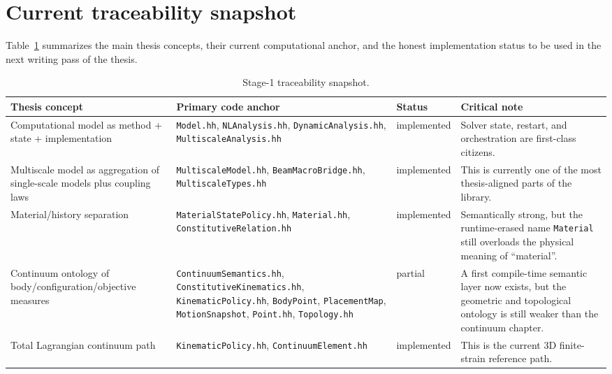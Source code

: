 \section{Current traceability snapshot}

Table~\ref{tab:stage1-traceability} summarizes the main thesis concepts, their
current computational anchor, and the honest implementation status to be used
in the next writing pass of the thesis.

\begin{table}[htbp]
  \centering
  \caption{Stage-1 traceability snapshot.}
  \label{tab:stage1-traceability}
  \small
  \begin{tabular}{@{}p{}p{}p{}p{}@{}}
    \toprule
    \textbf{Thesis concept} & \textbf{Primary code anchor} & \textbf{Status}
    & \textbf{Critical note} \\
    \midrule
    Computational model as method + state + implementation
    & \texttt{Model.hh}, \texttt{NLAnalysis.hh}, \texttt{DynamicAnalysis.hh},
      \texttt{MultiscaleAnalysis.hh}
    & implemented
    & Solver state, restart, and orchestration are first-class citizens. \\

    Multiscale model as aggregation of single-scale models plus coupling laws
    & \texttt{MultiscaleModel.hh}, \texttt{BeamMacroBridge.hh},
      \texttt{MultiscaleTypes.hh}
    & implemented
    & This is currently one of the most thesis-aligned parts of the library. \\

    Material/history separation
    & \texttt{MaterialStatePolicy.hh}, \texttt{Material.hh},
      \texttt{ConstitutiveRelation.hh}
    & implemented
    & Semantically strong, but the runtime-erased name \texttt{Material} still
      overloads the physical meaning of “material”. \\

    Continuum ontology of body/configuration/objective measures
    & \texttt{ContinuumSemantics.hh}, \texttt{ConstitutiveKinematics.hh}, \texttt{KinematicPolicy.hh},
      \texttt{BodyPoint}, \texttt{PlacementMap}, \texttt{MotionSnapshot},
      \texttt{Point.hh}, \texttt{Topology.hh}
    & partial
    & A first compile-time semantic layer now exists, but the geometric and
      topological ontology is still weaker than the continuum chapter. \\

    Total Lagrangian continuum path
    & \texttt{KinematicPolicy.hh}, \texttt{ContinuumElement.hh}
    & implemented
    & This is the current 3D finite-strain reference path. \\


\end{tabular}
\end{table}
